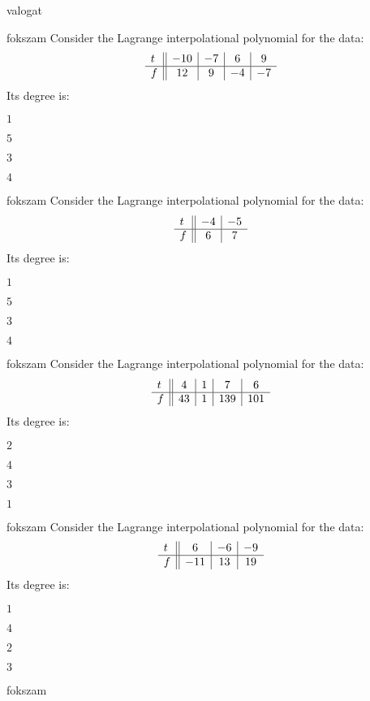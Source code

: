 \documentclass[12pt]{article}
\begin{document}
\begin{quiz}{valogat}
\begin{multi}{fokszam}
Consider the Lagrange interpolational polynomial for the data:
$$\begin{array}{l ||c|c|c|c}t&-10&-7&6&9\\ \hline f&12&9&-4&-7 \\ \end{array}$$
Its degree is:
\item* $ 1 $
\item  $ 5 $
\item  $ 3 $
\item  $ 4 $
\end{multi}
\begin{multi}{fokszam}
Consider the Lagrange interpolational polynomial for the data:
$$\begin{array}{l ||c|c}t&-4&-5\\ \hline f&6&7 \\ \end{array}$$
Its degree is:
\item* $ 1 $
\item  $ 5 $
\item  $ 3 $
\item  $ 4 $
\end{multi}
\begin{multi}{fokszam}
Consider the Lagrange interpolational polynomial for the data:
$$\begin{array}{l ||c|c|c|c}t&4&1&7&6\\ \hline f&43&1&139&101 \\ \end{array}$$
Its degree is:
\item* $ 2 $
\item  $ 4 $
\item  $ 3 $
\item  $ 1 $
\end{multi}
\begin{multi}{fokszam}
Consider the Lagrange interpolational polynomial for the data:
$$\begin{array}{l ||c|c|c}t&6&-6&-9\\ \hline f&-11&13&19 \\ \end{array}$$
Its degree is:
\item* $ 1 $
\item  $ 4 $
\item  $ 2 $
\item  $ 3 $
\end{multi}
\begin{multi}{fokszam}

\end{multi}
\end{quiz}
\end{document}

